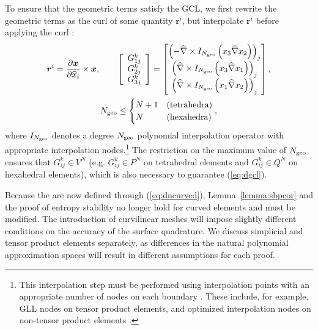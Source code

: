 \documentclass{svjour3}                     %
\renewcommand{\hat}{\widehat}
\newcommand{\pd}[2]{\frac{\partial#1}{\partial#2}}
\newcommand{\LRp}[1]{\left( #1 \right)}
\newcommand{\LRs}[1]{\left[ #1 \right]}
\newcommand{\Grad} {\ensuremath{\nabla}}
\newcommand{\bnote}[1]{{\color{blue}{#1}}}
\begin{document}
To ensure that the geometric terms satisfy the GCL, we first rewrite the geometric terms as the curl of some quantity $\bm{r}^i$, but interpolate $\bm{r}^i$ before applying the curl \cite{thomas1979geometric, visbal2002use, kopriva2006metric, hindenlang2012explicit, chan2018discretely}:
\begin{gather}
\bm{r}^i = { \pd{\bm{x}}{\hat{x}_i}\times \bm{x}}, \qquad
\LRs{\begin{array}{c}
{G}^k_{1j}\\
{G}^k_{2j}\\
{G}^k_{3j}\end{array}} = \begin{bmatrix}
\LRp{-\hat{\Grad}\times I_{N_{\rm geo}}\LRp{x_3\hat{\Grad}x_2}}_j\\
\LRp{\hat{\Grad}\times I_{N_{\rm geo}}\LRp{x_3\hat{\Grad}x_1}}_j\\
\LRp{\hat{\Grad}\times I_{N_{\rm geo}}\LRp{x_1\hat{\Grad}x_2}}_j
\end{bmatrix},\label{eq:iconscurl} \\
N_{\rm geo} \leq \begin{cases}
N+1 & \text{(tetrahedra)}\\
N & \text{(hexahedra)}
\end{cases},\nonumber
\end{gather}
where $I_{N_{\rm geo}}$ denotes a degree $N_{\rm geo}$ polynomial interpolation operator with appropriate interpolation nodes.\footnote{This interpolation step must be performed using interpolation points with an appropriate number of nodes on each boundary \cite{chan2018discretely}.  These include, for example, GLL nodes on tensor product elements, and optimized interpolation nodes on non-tensor product elements \cite{hesthaven1998electrostatics, warburton2006explicit, chan2015comparison}.}  The restriction on the maximum value of $N_{\rm geo}$ ensures that $G^k_{ij} \in V^N$ (e.g. $G^k_{ij} \in P^N$ on tetrahedral elements and $G^k_{ij}\in Q^N$ on hexahedral elements), which is also necessary to guarantee (\ref{eq:dgcl}).

Because the \bnote{skew-hybridized SBP operators $\bm{Q}^i_k$} are now defined through (\ref{eq:dncurved}), Lemma~\ref{lemma:sbpcor} and the proof of entropy stability no longer hold for curved elements and must be modified.  The introduction of curvilinear meshes will impose slightly different conditions on the accuracy of the surface quadrature.  We discuss simplicial and tensor product elements separately, as differences in the natural polynomial approximation spaces will result in different assumptions for each proof.
\end{document}
